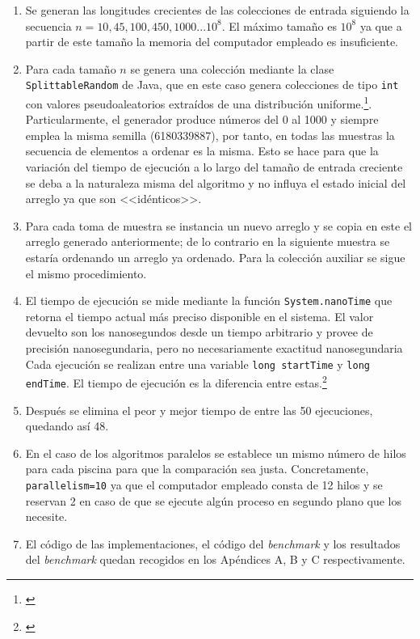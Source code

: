 \documentclass[titlepage]{article}
\begin{document}
\begin{enumerate}
	\item Se generan las longitudes crecientes de las colecciones de entrada siguiendo la secuencia $n=10, 45, 100, 450, 1000... 10^8$. El máximo tamaño es $10^8$ ya que a partir de este tamaño la memoria del computador empleado es insuficiente.
	\item Para cada tamaño $n$ se genera una colección mediante la clase \lstinline{SplittableRandom} de Java, que en este caso genera colecciones de tipo \lstinline{int} con valores pseudoaleatorios extraídos de una distribución uniforme.\footnote{\cite{OracleSplittableRandom}}. Particularmente, el generador produce números del 0 al 1000 y siempre emplea la misma semilla (6180339887), por tanto, en todas las muestras la secuencia de elementos a ordenar es la misma. Esto se hace para que la variación del tiempo de ejecución a lo largo del tamaño de entrada creciente se deba a la naturaleza misma del algoritmo y no influya el estado inicial del arreglo ya que son <<idénticos>>.
	\item Para cada toma de muestra se instancia un nuevo arreglo y se copia en este el arreglo generado anteriormente; de lo contrario en la siguiente muestra se estaría ordenando un arreglo ya ordenado. Para la colección auxiliar se sigue el mismo procedimiento.
	\item El tiempo de ejecución se mide mediante la función \lstinline{System.nanoTime} que retorna el tiempo actual más preciso disponible en el sistema. El valor devuelto son los nanosegundos desde un tiempo arbitrario y provee de precisión nanosegundaria, pero no necesariamente exactitud nanosegundaria Cada ejecución se realizan entre una variable \lstinline{long startTime} y \lstinline{long endTime}. El tiempo de ejecución es la diferencia entre estas.\footnote{\cite{OracleSystem}}
	\item Después se elimina el peor y mejor tiempo de entre las 50 ejecuciones, quedando así 48.
	\item En el caso de los algoritmos paralelos se establece un mismo número de hilos para cada piscina para que la comparación sea justa. Concretamente, \lstinline{parallelism=10} ya que el computador empleado consta de 12 hilos y se reservan 2 en caso de que se ejecute algún proceso en segundo plano que los necesite. 
	\item El código de las implementaciones, el código del \textit{benchmark} y los resultados del \textit{benchmark} quedan recogidos en los Apéndices A, B y C respectivamente.
	
\end{enumerate}
\end{document}
